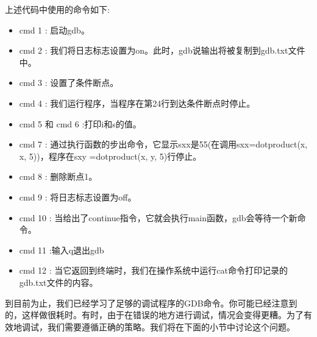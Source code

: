 上述代码中使用的命令如下: \par

\begin{itemize}
	\item cmd 1 : 启动gdb。
	\item cmd 2 : 我们将日志标志设置为on。此时，gdb说输出将被复制到gdb.txt文件中。
	\item cmd 3 : 设置了条件断点。
	\item cmd 4 : 我们运行程序，当程序在第24行到达条件断点时停止。
	\item cmd 5 和 cmd 6 :打印i和s的值。
	\item cmd 7 : 通过执行函数的步出命令，它显示sxx是55(在调用sxx=dotproduct(x, x, 5))，程序在sxy =dotproduct(x, y, 5)行停止。
	\item cmd 8 : 删除断点1。
	\item cmd 9 : 将日志标志设置为off。
	\item cmd 10 : 当给出了continue指令，它就会执行main函数，gdb会等待一个新命令。
	\item cmd 11 :输入q退出gdb
	\item cmd 12 : 当它返回到终端时，我们在操作系统中运行cat命令打印记录的gdb.txt文件的内容。
\end{itemize}

到目前为止，我们已经学习了足够的调试程序的GDB命令。你可能已经注意到的，这样做很耗时。有时，由于在错误的地方进行调试，情况会变得更糟。为了有效地调试，我们需要遵循正确的策略。我们将在下面的小节中讨论这个问题。 \par

